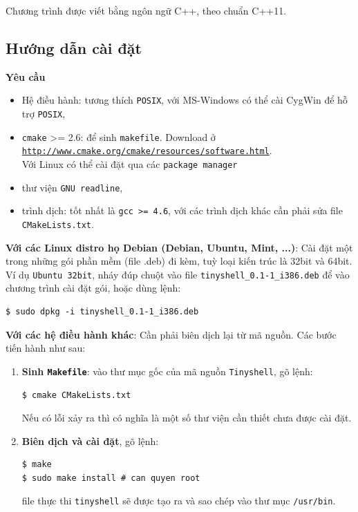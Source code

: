 \documentclass[a4paper,12pt]{report}
\begin{document}
        Chương trình được viết bằng ngôn ngữ C++, theo chuẩn C++11.

        \subsection{Hướng dẫn cài đặt}

        \textbf{Yêu cầu}
        \begin{itemize}
            \item Hệ điều hành: tương thích \texttt{POSIX}, với MS-Windows có thể cài
                CygWin để hỗ trợ \texttt{POSIX},
            \item \texttt{cmake} >= 2.6: để sinh \texttt{makefile}. Download ở \\
                \href{http://www.cmake.org/cmake/resources/software.html}{\texttt{http://www.cmake.org/cmake/resources/software.html}}.\\
                Với Linux có thể cài đặt qua các \texttt{package manager}
            \item thư viện \texttt{GNU readline},             
	    \item trình dịch: tốt nhất là \texttt{gcc >= 4.6}, với các trình dịch
                khác cần phải sửa file \texttt{CMakeLists.txt}.
        \end{itemize}

        \textbf{Với các Linux distro họ Debian (Debian, Ubuntu, Mint, ...)}:
            Cài đặt một trong những gói phần mềm (file .deb) đi kèm, tuỳ loại
            kiến trúc là 32bit và 64bit.\\
            Ví dụ \texttt{Ubuntu 32bit}, nháy đúp chuột vào file
            \texttt{tinyshell\_0.1-1\_i386.deb} để vào chương trình cài đặt
            gói, hoặc dùng lệnh:
                \begin{verbatim}
$ sudo dpkg -i tinyshell_0.1-1_i386.deb
                \end{verbatim}

        \textbf{Với các hệ điều hành khác}:
            Cần phải biên dịch lại từ mã nguồn. Các bước tiến hành như sau:
        \begin{enumerate}
            \item \textbf{Sinh \texttt{Makefile}}: vào thư mục gốc của mã nguồn
                \texttt{Tinyshell}, gõ lệnh:
                \begin{verbatim}
$ cmake CMakeLists.txt
                \end{verbatim}
                Nếu có lỗi xảy ra thì có nghĩa là một số thư viện cần thiết
                chưa được cài đặt.
            \item \textbf{Biên dịch và cài đặt}, gõ lệnh:
                \begin{verbatim}
$ make
$ sudo make install # can quyen root
                \end{verbatim}
                file thực thi \texttt{tinyshell} sẽ được tạo ra và sao chép vào
                thư mục \texttt{/usr/bin}.
        \end{enumerate}
\end{document}
